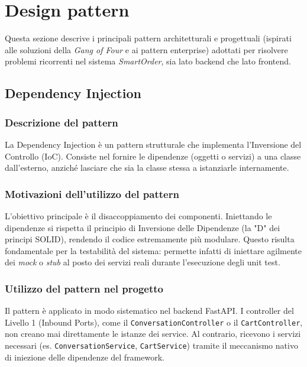 \documentclass[a4paper, 11pt, oneside]{scrartcl}
\begin{document}

\newpage
\section{Design pattern}

Questa sezione descrive i principali pattern architetturali e progettuali (ispirati alle soluzioni della \textit{Gang of Four} e ai pattern enterprise) adottati per risolvere problemi ricorrenti nel sistema \textit{SmartOrder}, sia lato backend che lato frontend.

\subsection{Dependency Injection}

\subsubsection{Descrizione del pattern}
La Dependency Injection è un pattern strutturale che implementa l'Inversione del Controllo (IoC). Consiste nel fornire le dipendenze (oggetti o servizi) a una classe dall'esterno, anziché lasciare che sia la classe stessa a istanziarle internamente.

\subsubsection{Motivazioni dell'utilizzo del pattern}
L'obiettivo principale è il disaccoppiamento dei componenti. Iniettando le dipendenze si rispetta il principio di Inversione delle Dipendenze (la "D" dei principi SOLID), rendendo il codice estremamente più modulare. Questo risulta fondamentale per la testabilità del sistema: permette infatti di iniettare agilmente dei \textit{mock} o \textit{stub} al posto dei servizi reali durante l'esecuzione degli unit test.

\subsubsection{Utilizzo del pattern nel progetto}
Il pattern è applicato in modo sistematico nel backend FastAPI. I controller del Livello 1 (Inbound Ports), come il \texttt{ConversationController} o il \texttt{CartController}, non creano mai direttamente le istanze dei service. Al contrario, ricevono i servizi necessari (es. \texttt{ConversationService}, \texttt{CartService}) tramite il meccanismo nativo di iniezione delle dipendenze del framework.
\end{document}
